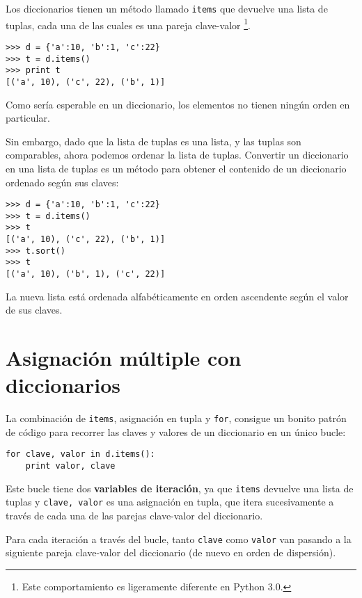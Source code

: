 
Los diccionarios tienen un método llamado {\tt items} que devuelve una lista de
tuplas, cada una de las cuales es una pareja clave-valor
\footnote{Este comportamiento es ligeramente diferente en Python 3.0.}.

\beforeverb
\begin{verbatim}
>>> d = {'a':10, 'b':1, 'c':22}
>>> t = d.items()
>>> print t
[('a', 10), ('c', 22), ('b', 1)]
\end{verbatim}
\afterverb
%
Como sería esperable en un diccionario, los elementos no
tienen ningún orden en particular.

Sin embargo, dado que la lista de tuplas es una lista, y las tuplas
son comparables, ahora podemos ordenar la lista de tuplas. Convertir un diccionario
en una lista de tuplas es un método para obtener el contenido de un
diccionario ordenado según sus claves:

\beforeverb
\begin{verbatim}
>>> d = {'a':10, 'b':1, 'c':22}
>>> t = d.items()
>>> t
[('a', 10), ('c', 22), ('b', 1)]
>>> t.sort()
>>> t
[('a', 10), ('b', 1), ('c', 22)]
\end{verbatim}
\afterverb
%
La nueva lista está ordenada alfabéticamente en orden ascendente según el valor de sus claves.

\section{Asignación múltiple con diccionarios}


La combinación de {\tt items}, asignación en tupla y {\tt for},
consigue un bonito patrón de código para recorrer las claves y valores
de un diccionario en un único bucle:

\beforeverb
\begin{verbatim}
for clave, valor in d.items():
    print valor, clave
\end{verbatim}
\afterverb
%
Este bucle tiene dos {\bf variables de iteración}, ya que {\tt items} devuelve
una lista de tuplas y {\tt clave, valor} es una asignación en tupla,
que itera sucesivamente a través de cada una de las parejas clave-valor del
diccionario.

Para cada iteración a través del bucle, tanto {\tt clave} como {\tt valor} van
pasando a la siguiente pareja clave-valor del diccionario
(de nuevo en orden de dispersión).

